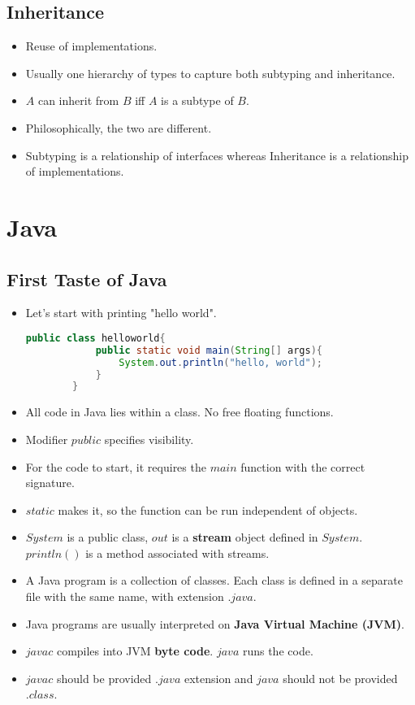 \documentclass[a4paper]{article}
\begin{document}
\subsection{Inheritance}
\begin{itemize}
    \item Reuse of implementations.
    \item Usually one hierarchy of types to capture both subtyping and inheritance.
    \item $A$ can inherit from $B$ iff $A$ is a subtype of $B$.
    \item Philosophically, the two are different.
    \item  Subtyping is a relationship of interfaces whereas Inheritance is a relationship of implementations.
\end{itemize}

\section{Java}
\subsection{First Taste of Java}
\begin{itemize}
    \item Let's start with printing "hello world".
    \begin{lstlisting}[language=Java]
        public class helloworld{
            public static void main(String[] args){
                System.out.println("hello, world");
            }
        }
    \end{lstlisting}
    \item All code in Java lies within a class. No free floating functions.
    \item Modifier $public$ specifies visibility.
    \item For the code to start, it requires the $main$ function with the correct signature.
    \item $static$ makes it, so the function can be run independent of objects.
    \item $System$ is a public class, $out$ is a \textbf{stream} object defined in $System$. $println()$ is a method associated with streams.
    \item A Java program is a collection of classes. Each class is defined in a separate file with the same name, with extension $.java$.
    \item Java programs are usually interpreted on \textbf{Java Virtual Machine (JVM)}.
    \item $javac$ compiles into JVM \textbf{byte code}. $java$ runs the code.
    \item $javac$ should be provided $.java$ extension and $java$ should not be provided $.class$.
\end{itemize}
\end{document}

